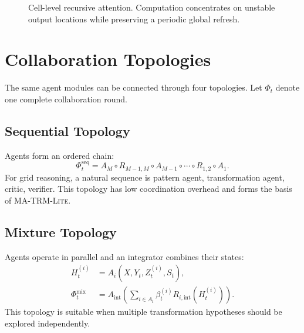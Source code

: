 \documentclass[10pt,a4paper,twocolumn]{article}
\newcommand{\MALite}{\textsc{MA-TRM-Lite}}
\begin{document}
\begin{figure}[t]
\centering
{}
\caption{Cell-level recursive attention. Computation concentrates on unstable output locations while preserving a periodic global refresh.}
\label{fig:cell_attention}
\end{figure}

\section{Collaboration Topologies}
The same agent modules can be connected through four topologies. Let $\Phi_t$ denote one complete collaboration round.

\subsection{Sequential Topology}
Agents form an ordered chain:
\begin{equation}
\Phi_t^{\mathrm{seq}}=A_M\circ R_{M-1,M}\circ A_{M-1}\circ\cdots\circ R_{1,2}\circ A_1. \label{eq:sequential}
\end{equation}
For grid reasoning, a natural sequence is pattern agent, transformation agent, critic, verifier. This topology has low coordination overhead and forms the basis of \MALite.

\subsection{Mixture Topology}
Agents operate in parallel and an integrator combines their states:
\begin{align}
H_t^{(i)} &= A_i(X,Y_t,Z_t^{(i)},S_t),\\
\Phi_t^{\mathrm{mix}} &= A_{\mathrm{int}}\!\left(\sum_{i\in A_t}\beta_t^{(i)}R_{i,\mathrm{int}}(H_t^{(i)})\right). \label{eq:mixture}
\end{align}
This topology is suitable when multiple transformation hypotheses should be explored independently.
\end{document}
